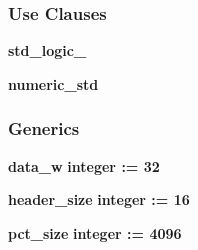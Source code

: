 \subsubsection*{Use Clauses}
 \begin{DoxyCompactItemize}
\item 
{\bf std\+\_\+logic\+\_}   
\item 
{\bf numeric\+\_\+std}   
\end{DoxyCompactItemize}
\subsubsection*{Generics}
 \begin{DoxyCompactItemize}
\item 
{\bf data\+\_\+w} {\bfseries {\bfseries \textcolor{comment}{integer}\textcolor{vhdlchar}{ }\textcolor{vhdlchar}{ }\textcolor{vhdlchar}{\+:}\textcolor{vhdlchar}{=}\textcolor{vhdlchar}{ }\textcolor{vhdlchar}{ } \textcolor{vhdldigit}{32} \textcolor{vhdlchar}{ }}}
\item 
{\bf header\+\_\+size} {\bfseries {\bfseries \textcolor{comment}{integer}\textcolor{vhdlchar}{ }\textcolor{vhdlchar}{ }\textcolor{vhdlchar}{\+:}\textcolor{vhdlchar}{=}\textcolor{vhdlchar}{ }\textcolor{vhdlchar}{ } \textcolor{vhdldigit}{16} \textcolor{vhdlchar}{ }}}
\item 
{\bf pct\+\_\+size} {\bfseries {\bfseries \textcolor{comment}{integer}\textcolor{vhdlchar}{ }\textcolor{vhdlchar}{ }\textcolor{vhdlchar}{\+:}\textcolor{vhdlchar}{=}\textcolor{vhdlchar}{ }\textcolor{vhdlchar}{ } \textcolor{vhdldigit}{4096} \textcolor{vhdlchar}{ }}}
\end{DoxyCompactItemize}
